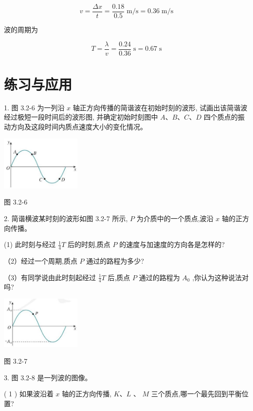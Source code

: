 \documentclass[10pt]{article}
\begin{document}
\[
v = \frac{\Delta x}{t} = \frac{0.18}{0.5}\mathrm{\;m}/\mathrm{s} = {0.36}\mathrm{\;m}/\mathrm{s}
\]

波的周期为

\[
T = \frac{\lambda }{v} = \frac{0.24}{0.36}\mathrm{\;s} = {0.67}\mathrm{\;s}
\]

\section*{练习与应用}

1. 图 3.2-6 为一列沿 \(x\) 轴正方向传播的简谐波在初始时刻的波形, 试画出该简谐波经过极短一段时间后的波形图, 并确定初始时刻图中 \(A\text{、}B\text{、}C\text{、}D\) 四个质点的振动方向及这段时间内质点速度大小的变化情况。

\begin{center}
\includegraphics[max width=0.3\textwidth]{images/01910e4c-ebb8-7d2c-8f2f-2375bc1d2d12_75_228099.jpg}
\end{center}

图 3.2-6

2. 简谐横波某时刻的波形如图 3.2-7 所示, \(P\) 为介质中的一个质点,波沿 \(x\) 轴的正方向传播。

(1) 此时刻与经过 \(\frac{1}{4}T\) 后的时刻,质点 \(P\) 的速度与加速度的方向各是怎样的?

（2）经过一个周期,质点 \(P\) 通过的路程为多少?

（3）有同学说由此时刻起经过 \(\frac{1}{4}T\) 后,质点 \(P\) 通过的路程为 \({A}_{0}\) ,你认为这种说法对吗?

\begin{center}
\includegraphics[max width=0.3\textwidth]{images/01910e4c-ebb8-7d2c-8f2f-2375bc1d2d12_75_935070.jpg}
\end{center}

图 3.2-7

3. 图 3.2-8 是一列波的图像。

( 1 ) 如果波沿着 \(x\) 轴的正方向传播, \(K\text{、}L\) 、 \(M\) 三个质点,哪一个最先回到平衡位置?
\end{document}

